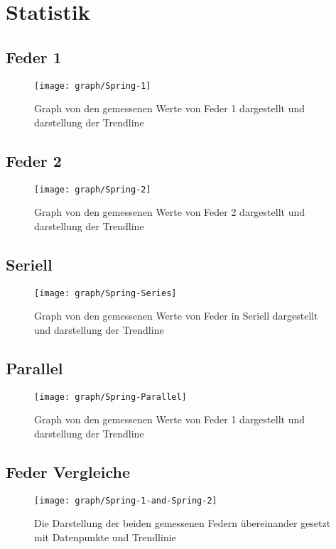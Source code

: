 \documentclass[../main.tex]{subfiles} %
\begin{document}
\section{Statistik}\label{sec:statistik}
\subsection{Feder 1}\label{subsec:statik-feder-1}
\begin{figure}[H]
    \centering
    \texttt{[image: graph/Spring-1]}
    \caption{Graph von den gemessenen Werte von Feder 1 dargestellt und darstellung der Trendline}
    \label{fig:graph-spring-1}
\end{figure}
\subsection{Feder 2}\label{subsec:statik-feder-2}
\begin{figure}[H]
    \centering
    \texttt{[image: graph/Spring-2]}
    \caption{Graph von den gemessenen Werte von Feder 2 dargestellt und darstellung der Trendline}
    \label{fig:graph-spring-2}
\end{figure}
\subsection{Seriell}\label{subsec:statik-spring-series}
\begin{figure}[H]
    \centering
    \texttt{[image: graph/Spring-Series]}
    \caption{Graph von den gemessenen Werte von Feder in Seriell dargestellt und darstellung der Trendline}
    \label{fig:graph-spring-series}
\end{figure}
\subsection{Parallel}\label{subsec:statik-spring-parallel}
\begin{figure}[H]
    \centering
    \texttt{[image: graph/Spring-Parallel]}
    \caption{Graph von den gemessenen Werte von Feder 1 dargestellt und darstellung der Trendline}
    \label{fig:graph-spring-parallel}
\end{figure}
\subsection{Feder Vergleiche}\label{subsec:statik-spring-comparisons}
\begin{figure}[H]
    \centering
    \texttt{[image: graph/Spring-1-and-Spring-2]}
    \caption{Die Darstellung der beiden gemessenen Federn übereinander gesetzt mit Datenpunkte und Trendlinie}
    \label{fig:graph-single-spring-comparisons}
\end{figure}
\end{document}
